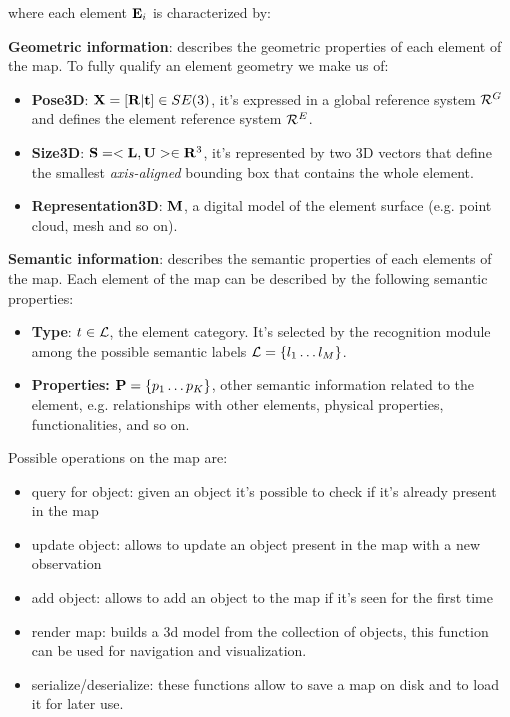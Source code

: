 \documentclass{article}
\begin{document}
	\noindent
	where each element $\mathbf{E}_i$ is characterized by:
	
	\begin{description}
		\item {\bf Geometric information}: describes the geometric properties of each element of the map. To fully qualify an element geometry we make us of:
		\begin{itemize}
			\item {\bf Pose3D}: $\mathbf{X} = [ \mathbf{R} | \mathbf{t}] \in SE(3)$, it's expressed in a global reference system $\mathcal{R}^G$ and defines the element reference system $\mathcal{R}^E$.
			\item {\bf Size3D}: $\mathbf{S} = <\mathbf{L} ,\mathbf{U}> \in \mathbf{R}^3 $, it's represented by two 3D vectors that define the smallest \emph{axis-aligned} bounding box that contains the whole element.
			\item {\bf Representation3D}: $\mathbf{M}$, a digital model of the element surface (e.g. point cloud, mesh and so on).
		\end{itemize}
		\item {\bf Semantic information}: describes the semantic properties of each elements of the map. Each element of the map can be described by the following semantic properties:
		\begin{itemize}
			\item {\bf Type}: $t \in \mathcal{L}$, the element category. It's selected by the recognition module among the possible semantic labels $\mathcal{L} = \{l_1 \dots l_M \}$.
			\item {\bf Properties:} $\mathbf{P} = \{ p_1 \dots p_K \}$, other semantic information related to the element, e.g. relationships with other elements, physical properties, functionalities, and so on. 
		\end{itemize}   
	\end{description}
	

	\noindent
	Possible operations on the map are:
	
	\begin{itemize}
		\item query for object: given an object it's possible to check if it's already present in the map
		\item update object: allows to update an object present in the map with a new observation
		\item add object: allows to add an object to the map if it's seen for the first time
		\item render map: builds a 3d model from the collection of objects, this function can be used for navigation and visualization.
		\item serialize/deserialize: these functions allow to save a map on disk and to load it for later use.
	\end{itemize}
			
\end{document}
